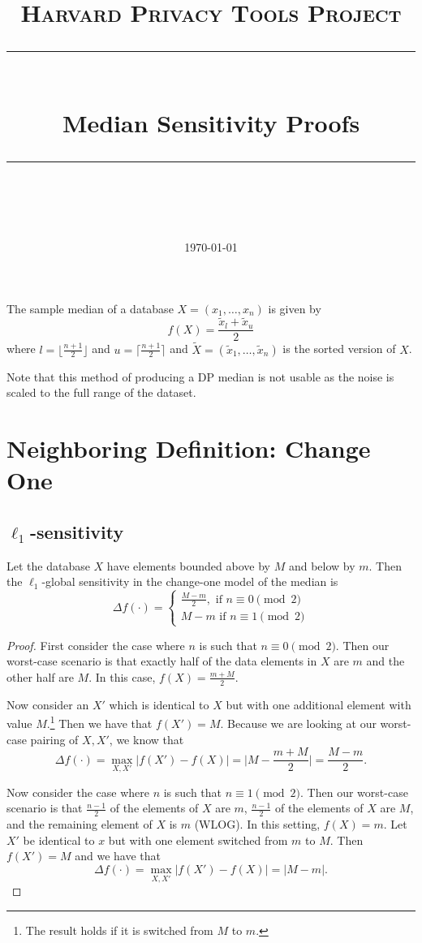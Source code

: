 \documentclass[11pt]{scrartcl} %
\title{
	\normalfont\normalsize
	\textsc{Harvard Privacy Tools Project}\\ %
	\vspace{25pt} %
	\rule{\linewidth}{0.5pt}\\ %
	\vspace{20pt} %
	{\huge Median Sensitivity Proofs}\\ %
	\vspace{12pt} %
	\rule{\linewidth}{2pt}\\ %
	\vspace{12pt} %
}
\date{\normalsize\today} %
\begin{document}
\maketitle

\begin{definition}
The sample median of a database $X = (x_1, \hdots, x_n)$ is given by
\[ f(X) = \frac{\tilde{x}_l + \tilde{x}_u}{2} \]
where $l = \lfloor \frac{n+1}{2} \rfloor$ and $u = \lceil \frac{n+1}{2} \rceil$ and
$\tilde{X} = (\tilde{x}_1, \hdots, \tilde{x}_n)$ is the sorted version of $X$.
\end{definition}

Note that this method of producing a DP median is not usable as the noise is scaled to the full range of the dataset.
\section{Neighboring Definition: Change One}

\subsection{$\ell_1$-sensitivity}
\begin{theorem}
	Let the database $X$ have elements bounded above by $M$ and below by $m$.
	Then the $\ell_1$-global sensitivity in the change-one model of the median is
	\[
		\Delta f(\cdot) =
			\begin{cases}
				\frac{M - m}{2}, \text{ if } n \equiv 0 \pmod{2} \\
				M-m \text{ if } n \equiv 1 \pmod{2}
			\end{cases}
	\]
\end{theorem}

\begin{proof}
	First consider the case where $n$ is such that $n \equiv 0 \pmod{2}$. Then our worst-case scenario is that exactly half of the data elements in $X$ are $m$ and the other half are $M$. In this case,
	$f(X) = \frac{m + M}{2}$. \newline

	Now consider an $X'$ which is identical to $X$ but with one additional element with value $M$.\footnote{The result holds if it is switched from $M$ to $m$.}
	Then we have that $f(X') = M$. Because we are looking at our worst-case pairing of $X,X'$,
	we know that
	\[ \Delta f(\cdot) = \max_{X,X'} |f(X') - f(X)| = \big\vert M - \frac{m+M}{2} \big\vert = \frac{M-m}{2}. \]

	Now consider the case where $n$ is such that $n \equiv 1 \pmod{2}$.
	Then our worst-case scenario is that $\frac{n-1}{2}$ of the elements of $X$ are $m$,
	$\frac{n-1}{2}$ of the elements of $X$ are $M$, and the remaining element of $X$ is $m$ (WLOG).
	In this setting, $f(X) = m$.
	Let $X'$ be identical to $x$ but with one element switched from $m$ to $M$.
	Then $f(X') = M$ and we have that
	\[ \Delta f(\cdot) = \max_{X,X'} |f(X') - f(X)| = |M - m|. \]
\end{proof}
\end{document}
